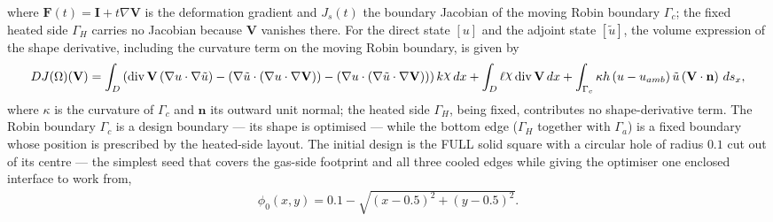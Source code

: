 \documentclass[preview]{standalone}
\let\oldcdot\cdot
\let\cdot\oldcdot
\begin{document}
where $\mathbf F(t) = \mathbf I + t \nabla \mathbf V$ is the deformation gradient and $J_{s}(t)$ the boundary Jacobian of the moving Robin boundary $\Gamma_c$; the fixed heated side $\Gamma_H$ carries no Jacobian because $\mathbf V$ vanishes there.
For the direct state $\left[ u\right]$ and the adjoint state $\left[ \tilde u\right]$, the volume expression of the shape derivative, including the curvature term on the moving Robin boundary, is given by
\begin{dmath*}
DJ(\Omega)(\mathbf V) = \int_{D} \left(\operatorname{div} {\mathbf V} \left(  \nabla u  \cdot  \nabla \tilde u  \right) - \left(  \nabla \tilde u  \cdot \left(  \nabla u  \cdot  \nabla {\mathbf V}  \right) \right) - \left(  \nabla u  \cdot \left(  \nabla \tilde u  \cdot  \nabla {\mathbf V}  \right) \right)\right) k \raisebox{\depth}{$\chi$} \,dx + \int_{D} \ell \raisebox{\depth}{$\chi$} \operatorname{div} {\mathbf V} \,dx + \int_{\Gamma_c} \kappa h \left( u - u_{amb}\right) \tilde u \left(\mathbf V \cdot \mathbf n\right) \,ds_x ,
\end{dmath*}
where $\kappa$ is the curvature of $\Gamma_c$ and $\mathbf n$ its outward unit normal; the heated side $\Gamma_H$, being fixed, contributes no shape-derivative term.  The Robin boundary $\Gamma_c$ is a design boundary — its shape is optimised — while the bottom edge ($\Gamma_H$ together with $\Gamma_a$) is a fixed boundary whose position is prescribed by the heated-side layout.
The initial design is the FULL solid square with a circular hole of radius $0.1$ cut out of its centre — the simplest seed that covers the gas-side footprint and all three cooled edges while giving the optimiser one enclosed interface to work from,
\begin{align*}
\phi_0(x,y) = 0.1 - \sqrt{\left( x - 0.5 \right)^{2} + \left( y - 0.5 \right)^{2}} .
\end{align*}
\end{document}
